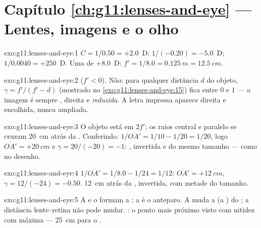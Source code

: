 \section*{Capítulo \ref{ch:g11:lenses-and-eye} --- Lentes, imagens e o olho}

\begin{solution}{exo:g11:lenses-and-eye:1}
$C = 1/0.50 = +2.0$~D; $1/(-0.20) = -5.0$~D; $1/0.0040 = +250$~D. Uma
 de $+8.0$~D: $f' = 1/8.0 = \qty{0.125}{m} = \qty{12.5}{cm}$.
\end{solution}

\begin{solution}{exo:g11:lenses-and-eye:2}
 ($f' < 0$). Não: para qualquer distância $d$ do objeto,
$\gamma = f'/(f' - d)$ (mostrado no \cref{exo:g11:lenses-and-eye:15})
fica entre $0$ e $1$ --- a imagem é sempre , direita e
\emph{reduzida}. A letra impressa aparece direita e encolhida, nunca
ampliada.
\end{solution}

\begin{solution}{exo:g11:lenses-and-eye:3}
O objeto está em $2f'$; os raios central e paralelo se cruzam
\qty{20}{cm} atrás da . Conferindo:
$1/\overline{OA'} = 1/10 - 1/20 = 1/20$, logo
$\overline{OA'} = +\qty{20}{cm}$ e $\gamma = 20/(-20) = -1$: ,
invertida e do mesmo tamanho --- como no desenho.
\end{solution}

\begin{solution}{exo:g11:lenses-and-eye:4}
$1/\overline{OA'} = 1/8.0 - 1/24 = 1/12$:
$\overline{OA'} = +\qty{12}{cm}$, $\gamma = 12/(-24) = -0.50$.  \qty{12}{cm} atrás da , invertida, com metade do tamanho.
\end{solution}

\begin{solution}{exo:g11:lenses-and-eye:5}
A  e o  formam a ; a  é o
anteparo. A  muda a  (a ) do
; a distância lente--retina não pode mudar. : o
ponto mais próximo visto com nitidez com  máxima ---
\qty{25}{cm} para o .
\end{solution}

